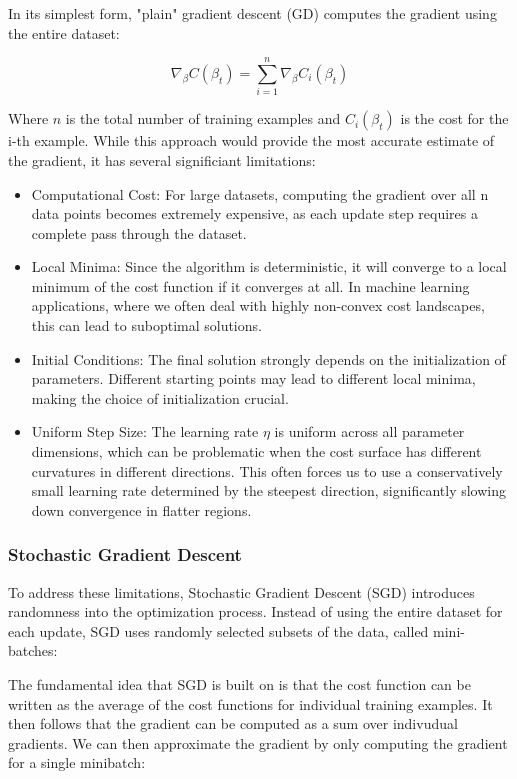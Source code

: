 \documentclass[aps,pra,english,notitlepage,reprint,nofootinbib]{revtex4-1}  %
\begin{document}
In its simplest form, "plain" gradient descent (GD) computes the gradient using the entire dataset:

\begin{equation}
    \nabla_\beta C(\beta_t) = \sum_{i=1}^{n} \nabla_\beta C_i(\beta_t)
\end{equation}

Where \( n\) is the total number of training examples and \( C_i(\beta_t) \) is the cost for the i-th example. While this approach would provide the most accurate estimate of the gradient, it has several significiant limitations:
\begin{itemize}
    \item Computational Cost: For large datasets, computing the gradient over all n data points becomes extremely expensive, as each update step requires a complete pass through the dataset.
    \item Local Minima: Since the algorithm is deterministic, it will converge to a local minimum of the cost function if it converges at all. In machine learning applications, where we often deal with highly non-convex cost landscapes, this can lead to suboptimal solutions.
    \item Initial Conditions: The final solution strongly depends on the initialization of parameters. Different starting points may lead to different local minima, making the choice of initialization crucial.
    \item Uniform Step Size: The learning rate \( \eta \) is uniform across all parameter dimensions, which can be problematic when the cost surface has different curvatures in different directions. This often forces us to use a conservatively small learning rate determined by the steepest direction, significantly slowing down convergence in flatter regions.
\end{itemize}

\subsubsection{Stochastic Gradient Descent}

To address these limitations, Stochastic Gradient Descent (SGD) introduces randomness into the optimization process. Instead of using the entire dataset for each update, SGD uses randomly selected subsets of the data, called mini-batches:

The fundamental idea that SGD is built on is that the cost function can be written as the average of the cost functions for individual training examples. It then follows that the gradient can be computed as a sum over indivudual gradients. We can then approximate the gradient by only computing the gradient for a single minibatch:
\end{document}
